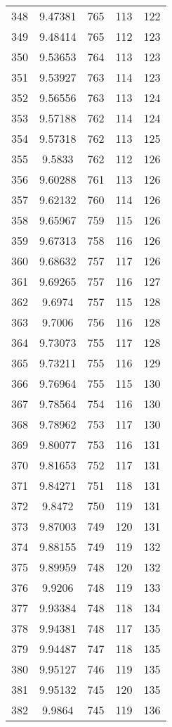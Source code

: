 \documentclass[12pt,a4paper]{article}
\begin{document}
\begin{tabular}{r|cccc}
	348 & 9.47381 & 765 & 113 & 122 \\
	349 & 9.48414 & 765 & 112 & 123 \\
	350 & 9.53653 & 764 & 113 & 123 \\
	351 & 9.53927 & 763 & 114 & 123 \\
	352 & 9.56556 & 763 & 113 & 124 \\
	353 & 9.57188 & 762 & 114 & 124 \\
	354 & 9.57318 & 762 & 113 & 125 \\
	355 & 9.5833 & 762 & 112 & 126 \\
	356 & 9.60288 & 761 & 113 & 126 \\
	357 & 9.62132 & 760 & 114 & 126 \\
	358 & 9.65967 & 759 & 115 & 126 \\
	359 & 9.67313 & 758 & 116 & 126 \\
	360 & 9.68632 & 757 & 117 & 126 \\
	361 & 9.69265 & 757 & 116 & 127 \\
	362 & 9.6974 & 757 & 115 & 128 \\
	363 & 9.7006 & 756 & 116 & 128 \\
	364 & 9.73073 & 755 & 117 & 128 \\
	365 & 9.73211 & 755 & 116 & 129 \\
	366 & 9.76964 & 755 & 115 & 130 \\
	367 & 9.78564 & 754 & 116 & 130 \\
	368 & 9.78962 & 753 & 117 & 130 \\
	369 & 9.80077 & 753 & 116 & 131 \\
	370 & 9.81653 & 752 & 117 & 131 \\
	371 & 9.84271 & 751 & 118 & 131 \\
	372 & 9.8472 & 750 & 119 & 131 \\
	373 & 9.87003 & 749 & 120 & 131 \\
	374 & 9.88155 & 749 & 119 & 132 \\
	375 & 9.89959 & 748 & 120 & 132 \\
	376 & 9.9206 & 748 & 119 & 133 \\
	377 & 9.93384 & 748 & 118 & 134 \\
	378 & 9.94381 & 748 & 117 & 135 \\
	379 & 9.94487 & 747 & 118 & 135 \\
	380 & 9.95127 & 746 & 119 & 135 \\
	381 & 9.95132 & 745 & 120 & 135 \\
	382 & 9.9864 & 745 & 119 & 136 \\

\end{tabular}
\end{document}
